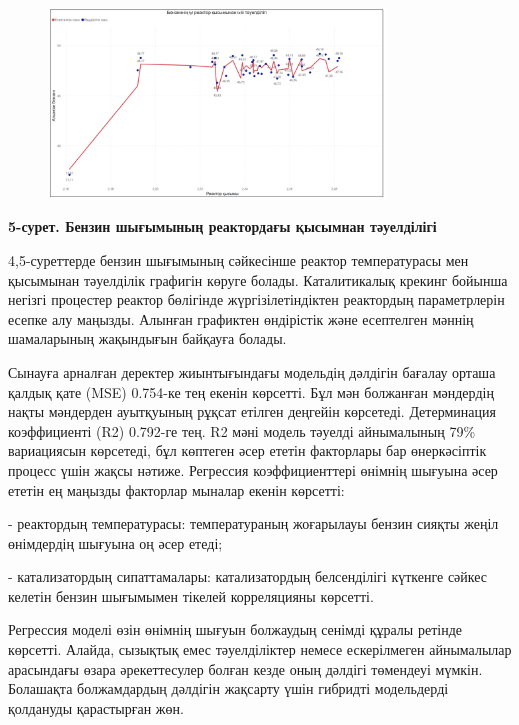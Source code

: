 \begin{figure}[H]
	\centering
	\includegraphics[width=0.8\textwidth]{media/ict/image98}
	\caption*{}
\end{figure}


{\bfseries 5-сурет. Бензин шығымының реактордағы қысымнан тәуелділігі}

4,5-суреттерде бензин шығымының сәйкесінше реактор температурасы мен
қысымынан тәуелділік графигін көруге болады. Каталитикалық крекинг
бойынша негізгі процестер реактор бөлігінде жүргізілетіндіктен
реактордың параметрлерін есепке алу маңызды. Алынған графиктен
өндірістік және есептелген мәннің шамаларының жақындығын байқауға
болады.

Сынауға арналған деректер жиынтығындағы модельдің дәлдігін бағалау
орташа қалдық қате (MSE) 0.754-ке тең екенін көрсетті. Бұл мән болжанған
мәндердің нақты мәндерден ауытқуының рұқсат етілген деңгейін көрсетеді.
Детерминация коэффициенті (R2) 0.792-ге тең. R2 мәні модель тәуелді
айнымалының 79\% вариациясын көрсетеді, бұл көптеген әсер ететін
факторлары бар өнеркәсіптік процесс үшін жақсы нәтиже. Регрессия
коэффициенттері өнімнің шығуына әсер ететін ең маңызды факторлар мыналар
екенін көрсетті:

- реактордың температурасы: температураның жоғарылауы бензин сияқты
жеңіл өнімдердің шығуына оң әсер етеді;

- катализатордың сипаттамалары: катализатордың белсенділігі күткенге
сәйкес келетін бензин шығымымен тікелей корреляцияны көрсетті.

Регрессия моделі өзін өнімнің шығуын болжаудың сенімді құралы ретінде
көрсетті. Алайда, сызықтық емес тәуелділіктер немесе ескерілмеген
айнымалылар арасындағы өзара әрекеттесулер болған кезде оның дәлдігі
төмендеуі мүмкін. Болашақта болжамдардың дәлдігін жақсарту үшін гибридті
модельдерді қолдануды қарастырған жөн.

